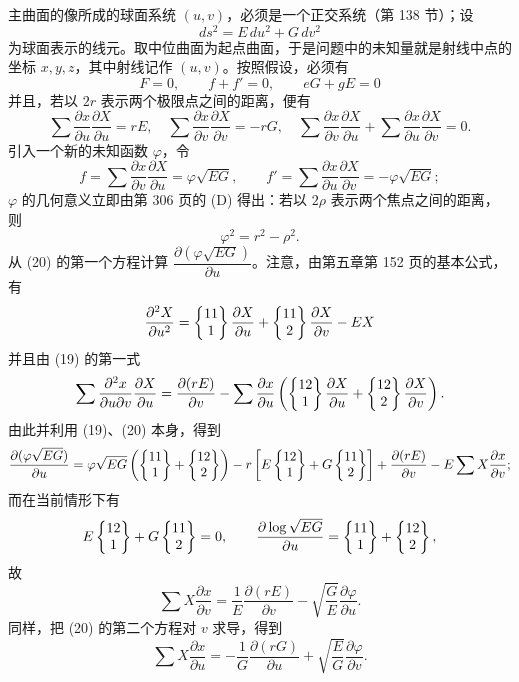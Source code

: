 主曲面的像所成的球面系统 \((u,v)\)，必须是一个正交系统（第 138 节）；设
\[
 ds^2=E\,du^2+G\,dv^2
\]
为球面表示的线元。取中位曲面为起点曲面，于是问题中的未知量就是射线中点的坐标 \(x,y,z\)，其中射线记作 \((u,v)\)。按照假设，必须有
\[
 F=0,
 \qquad f+f'=0,
 \qquad eG+gE=0
\]
并且，若以 \(2r\) 表示两个极限点之间的距离，便有
\begin{equation}\tag{19}
 \sum\frac{\partial x}{\partial u}\frac{\partial X}{\partial u}=rE,
 \quad
 \sum\frac{\partial x}{\partial v}\frac{\partial X}{\partial v}=-rG,
 \quad
 \sum\frac{\partial x}{\partial v}\frac{\partial X}{\partial u}+\sum\frac{\partial x}{\partial u}\frac{\partial X}{\partial v}=0.
\end{equation}
引入一个新的未知函数 \(\varphi\)，令
\begin{equation}\tag{20}
 f=\sum\frac{\partial x}{\partial v}\frac{\partial X}{\partial u}=\varphi\sqrt{EG},
 \qquad
 f'=\sum\frac{\partial x}{\partial u}\frac{\partial X}{\partial v}=-\varphi\sqrt{EG};
\end{equation}
\(\varphi\) 的几何意义立即由第 306 页的 (D) 得出：若以 \(2\rho\) 表示两个焦点之间的距离，则
\begin{equation}\tag{21}
 \varphi^2=r^2-\rho^2.
\end{equation}
从 (20) 的第一个方程计算 \(\dfrac{\partial(\varphi\sqrt{EG})}{\partial u}\)。注意，由第五章第 152 页的基本公式，有
\[
 \frac{\partial^2X}{\partial u^2}=\left\{\begin{matrix}11\\1\end{matrix}\right\}\frac{\partial X}{\partial u}+\left\{\begin{matrix}11\\2\end{matrix}\right\}\frac{\partial X}{\partial v}-EX
\]
并且由 (19) 的第一式
\[
 \sum\frac{\partial^2x}{\partial u\partial v}\frac{\partial X}{\partial u}
 =\frac{\partial(rE)}{\partial v}-\sum\frac{\partial x}{\partial u}
 \left(\left\{\begin{matrix}12\\1\end{matrix}\right\}\frac{\partial X}{\partial u}+\left\{\begin{matrix}12\\2\end{matrix}\right\}\frac{\partial X}{\partial v}\right).
\]
由此并利用 (19)、(20) 本身，得到
\[
\frac{\partial(\varphi\sqrt{EG})}{\partial u}
=\varphi\sqrt{EG}\left(\left\{\begin{matrix}11\\1\end{matrix}\right\}+\left\{\begin{matrix}12\\2\end{matrix}\right\}\right)
-r\left[E\left\{\begin{matrix}12\\1\end{matrix}\right\}+G\left\{\begin{matrix}11\\2\end{matrix}\right\}\right]
+\frac{\partial(rE)}{\partial v}-E\sum X\frac{\partial x}{\partial v};
\]
而在当前情形下有
\[
 E\left\{\begin{matrix}12\\1\end{matrix}\right\}+G\left\{\begin{matrix}11\\2\end{matrix}\right\}=0,
 \qquad
 \frac{\partial\log\sqrt{EG}}{\partial u}=\left\{\begin{matrix}11\\1\end{matrix}\right\}+\left\{\begin{matrix}12\\2\end{matrix}\right\},
\]
故
\begin{equation}\tag{a}
 \sum X\frac{\partial x}{\partial v}
 =\frac1E\frac{\partial(rE)}{\partial v}-\sqrt{\frac GE}\frac{\partial\varphi}{\partial u}.
\end{equation}
同样，把 (20) 的第二个方程对 \(v\) 求导，得到
\begin{equation}\tag{b}
 \sum X\frac{\partial x}{\partial u}
 =-\frac1G\frac{\partial(rG)}{\partial u}+\sqrt{\frac EG}\frac{\partial\varphi}{\partial v}.
\end{equation}
